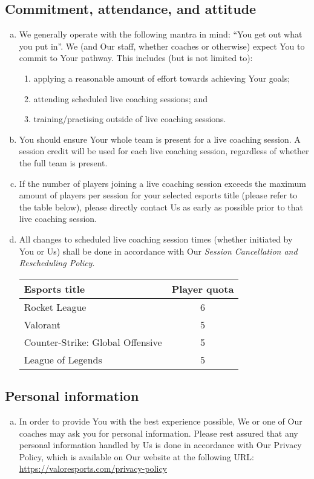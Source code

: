 \documentclass[10pt]{article}
\begin{document}
\subsection{Commitment, attendance, and attitude}
\begin{enumerate}[(a)]
\item
We generally operate with the following mantra in mind: ``You get out what you put in''. We (and Our staff, whether coaches or otherwise) expect You to commit to Your pathway. This includes (but is not limited to):
\begin{enumerate}[(1)]
\item
applying a reasonable amount of effort towards achieving Your goals;

\item
attending scheduled live coaching sessions; and

\item
training/practising outside of live coaching sessions.
\end{enumerate}

\item
You should ensure Your whole team is present for a live coaching session. A session credit will be used for each live coaching session, regardless of whether the full team is present.

\item
If the number of players joining a live coaching session exceeds the maximum amount of players per session for your selected esports title (please refer to the table below), please directly contact Us as early as possible prior to that live coaching session.

\item
All changes to scheduled live coaching session times (whether initiated by You or Us) shall be done in accordance with Our \textit{Session Cancellation and Rescheduling Policy}.

\begin{tabular}{ |l|c| }
\hline
\textbf{Esports title} & \textbf{Player quota} \\
\hline
Rocket League & 6 \\
\hline
Valorant & 5 \\
\hline
Counter-Strike: Global Offensive & 5 \\
\hline
League of Legends & 5 \\
\hline
\end{tabular}
\end{enumerate}

\subsection{Personal information}
\begin{enumerate}[(a)]
\item
In order to provide You with the best experience possible, We or one of Our coaches may ask you for personal information. Please rest assured that any personal information handled by Us is done in accordance with Our Privacy Policy, which is available on Our website at the following URL: \url{https://valoresports.com/privacy-policy}
\end{enumerate}
\end{document}
